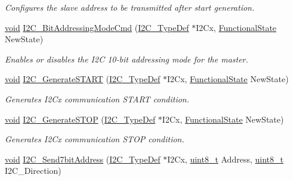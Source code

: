 \begin{DoxyCompactItemize}
\begin{DoxyCompactList}\small\item\em Configures the slave address to be transmitted after start generation. \end{DoxyCompactList}\item 
\hyperlink{group___n_a_m_e_ga18028b8badbf1ea7e704ccac3c488e82}{void} \hyperlink{group___i2_c___group1_gae736441388d4532455d264b1f11a661a}{I2\-C\-\_\-Bit\-Addressing\-Mode\-Cmd} (\hyperlink{struct_i2_c___type_def}{I2\-C\-\_\-\-Type\-Def} $\ast$I2\-Cx, \hyperlink{group___exported__types_gac9a7e9a35d2513ec15c3b537aaa4fba1}{Functional\-State} New\-State)
\begin{DoxyCompactList}\small\item\em Enables or disables the I2\-C 10-\/bit addressing mode for the master. \end{DoxyCompactList}\item 
\hyperlink{group___n_a_m_e_ga18028b8badbf1ea7e704ccac3c488e82}{void} \hyperlink{group___i2_c___group1_ga36c522b471588be9779c878222ccb20f}{I2\-C\-\_\-\-Generate\-S\-T\-A\-R\-T} (\hyperlink{struct_i2_c___type_def}{I2\-C\-\_\-\-Type\-Def} $\ast$I2\-Cx, \hyperlink{group___exported__types_gac9a7e9a35d2513ec15c3b537aaa4fba1}{Functional\-State} New\-State)
\begin{DoxyCompactList}\small\item\em Generates I2\-Cx communication S\-T\-A\-R\-T condition. \end{DoxyCompactList}\item 
\hyperlink{group___n_a_m_e_ga18028b8badbf1ea7e704ccac3c488e82}{void} \hyperlink{group___i2_c___group1_ga5c92cb573ca0ae58cc465e5400246561}{I2\-C\-\_\-\-Generate\-S\-T\-O\-P} (\hyperlink{struct_i2_c___type_def}{I2\-C\-\_\-\-Type\-Def} $\ast$I2\-Cx, \hyperlink{group___exported__types_gac9a7e9a35d2513ec15c3b537aaa4fba1}{Functional\-State} New\-State)
\begin{DoxyCompactList}\small\item\em Generates I2\-Cx communication S\-T\-O\-P condition. \end{DoxyCompactList}\item 
\hyperlink{group___n_a_m_e_ga18028b8badbf1ea7e704ccac3c488e82}{void} \hyperlink{group___i2_c___group1_ga009fc2a5b2313c36da39ece39a1156a6}{I2\-C\-\_\-\-Send7bit\-Address} (\hyperlink{struct_i2_c___type_def}{I2\-C\-\_\-\-Type\-Def} $\ast$I2\-Cx, \hyperlink{stdint_8h_aba7bc1797add20fe3efdf37ced1182c5}{uint8\-\_\-t} Address, \hyperlink{stdint_8h_aba7bc1797add20fe3efdf37ced1182c5}{uint8\-\_\-t} I2\-C\-\_\-\-Direction)

\end{DoxyCompactItemize}
